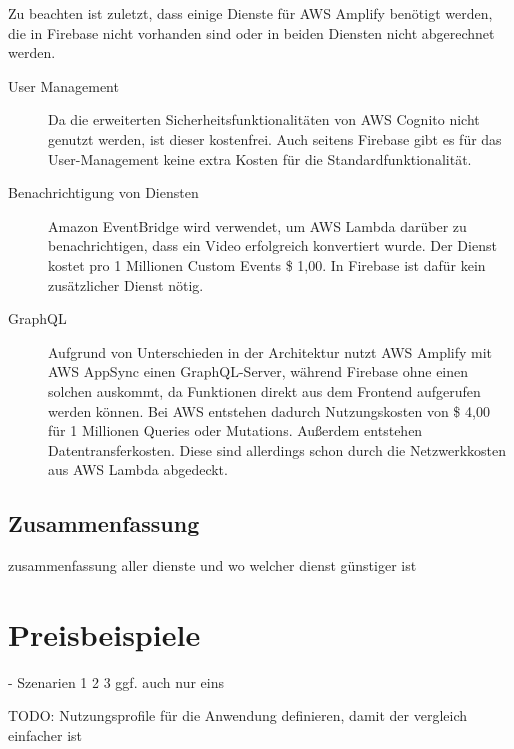 Zu beachten ist zuletzt, dass einige Dienste für \ac{AWS} Amplify benötigt werden, die in Firebase nicht vorhanden sind oder in beiden Diensten nicht abgerechnet werden.
\begin{description}
\item[User Management] Da die erweiterten Sicherheitsfunktionalitäten von \ac{AWS} Cognito nicht genutzt werden, ist dieser kostenfrei. Auch seitens Firebase gibt es für das User-Management keine extra Kosten für die Standardfunktionalität.
\item[Benachrichtigung von Diensten] Amazon EventBridge wird verwendet, um \ac{AWS} Lambda darüber zu benachrichtigen, dass ein Video erfolgreich konvertiert wurde. Der Dienst kostet pro 1 Millionen Custom Events \$ 1,00. In Firebase ist dafür kein zusätzlicher Dienst nötig.
\item[GraphQL] Aufgrund von Unterschieden in der Architektur nutzt \ac{AWS} Amplify mit AWS AppSync einen GraphQL-Server, während Firebase ohne einen solchen auskommt, da Funktionen direkt aus dem Frontend aufgerufen werden können. Bei \ac{AWS} entstehen dadurch Nutzungskosten von \$ 4,00 für 1 Millionen Queries oder Mutations. Außerdem entstehen Datentransferkosten. Diese sind allerdings schon durch die Netzwerkkosten aus \ac{AWS} Lambda abgedeckt.
\end{description}

\subsection{Zusammenfassung}

zusammenfassung aller dienste und wo welcher dienst günstiger ist

\section{Preisbeispiele}

- Szenarien 1 2 3 ggf. auch nur eins

TODO: Nutzungsprofile für die Anwendung definieren, damit der vergleich einfacher ist